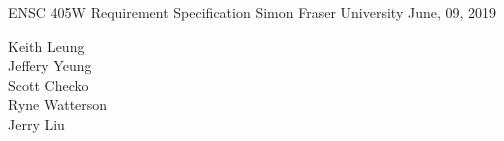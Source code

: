 \documentclass{article}
\begin{document}
\thispagestyle{empty}
\begin{titlepage}
  \null\vfill

  \begin{center}

  {\Huge ENSC 405W }
  \vskip 1cm
  {\Huge Requirement Specification }
  \vskip 1cm
  {\LARGE Simon Fraser University}
  \vskip 0.5cm
  {\LARGE June, 09, 2019}
  \end{center}
  
  \vfill
  \vfill
  \vfill

  \begin{flushright}
  Keith Leung\\
  Jeffery Yeung\\
  Scott Checko\\
  Ryne Watterson\\
  Jerry Liu\\
\end{flushright}
\end{titlepage}
\end{document}
